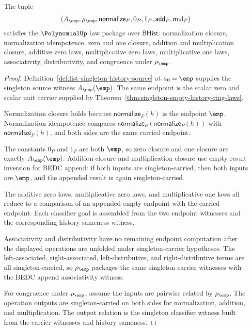 \begin{theorem}
\label{thm:singleton-empty-history-polynomial-laws}
The tuple
$$
(A_{\emp},\rho_{\emp},\mathsf{normalize}_P,
0_P,1_P,\mathsf{add}_P,\mathsf{mul}_P)
$$
satisfies the $\PolynomialUp$ law package over $\mathsf{BHist}$: normalization
closure, normalization idempotence, zero and one closure, addition and
multiplication closure, additive zero laws, multiplicative zero laws,
multiplicative one laws, associativity, distributivity, and congruence under
$\rho_{\emp}$.
\end{theorem}
\begin{proof}
Definition~\ref{def:list-singleton-history-source} at $a_0=\emp$ supplies the
singleton source witness $A_{\emp}(\emp)$. The same endpoint is the scalar
zero and scalar unit carrier supplied by
Theorem~\ref{thm:singleton-empty-history-ring-laws}.

Normalization closure holds because $\mathsf{normalize}_P(h)$ is the endpoint
$\emp$. Normalization idempotence compares
$\mathsf{normalize}_P(\mathsf{normalize}_P(h))$ with
$\mathsf{normalize}_P(h)$, and both sides are the same carried endpoint.

The constants $0_P$ and $1_P$ are both $\emp$, so zero closure and one closure
are exactly $A_{\emp}(\emp)$. Addition closure and multiplication closure use
empty-result inversion for BEDC append: if both inputs are singleton-carried,
then both inputs are $\emp$, and the appended result is again singleton-carried.

The additive zero laws, multiplicative zero laws, and multiplicative one laws
all reduce to a comparison of an appended empty endpoint with the carried
endpoint. Each classifier goal is assembled from the two endpoint witnesses and
the corresponding history-sameness witness.

Associativity and distributivity have no remaining endpoint computation after
the displayed operations are unfolded under singleton-carrier hypotheses. The
left-associated, right-associated, left-distributive, and right-distributive
terms are all singleton-carried, so $\rho_{\emp}$ packages the same singleton
carrier witnesses with the BEDC append associativity witness.

For congruence under $\rho_{\emp}$, assume the inputs are pairwise related by
$\rho_{\emp}$. The operation outputs are singleton-carried on both sides for
normalization, addition, and multiplication. The output relation is the
singleton classifier witness built from the carrier witnesses and
history-sameness.
\end{proof}

